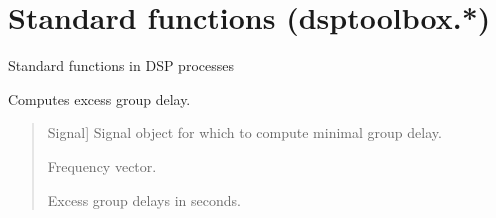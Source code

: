 \documentclass[letterpaper,10pt,english]{sphinxmanual}
\begin{document}
\sphinxstepscope


\section{Standard functions (dsptoolbox.*)}
\label{\detokenize{modules/dsptoolbox.standard_functions:module-dsptoolbox.standard_functions}}\label{\detokenize{modules/dsptoolbox.standard_functions:standard-functions-dsptoolbox}}\label{\detokenize{modules/dsptoolbox.standard_functions::doc}}
\sphinxAtStartPar
Standard functions in DSP processes

\begin{fulllineitems}
\label{\detokenize{modules/dsptoolbox.standard_functions:dsptoolbox.standard_functions.excess_group_delay}}
\pysigstartsignatures
{}
\pysigstopsignatures
\sphinxAtStartPar
Computes excess group delay.
\begin{quote}\begin{description}
\begin{description}
\sphinxlineitem{\sphinxstylestrong{signal}}{[}Signal{]}
\sphinxAtStartPar
Signal object for which to compute minimal group delay.

\end{description}

\begin{description}
\sphinxlineitem{\sphinxstylestrong{f}}{[}\sphinxtitleref{np.ndarray}{]}
\sphinxAtStartPar
Frequency vector.

\sphinxlineitem{\sphinxstylestrong{ex\_gd}}{[}\sphinxtitleref{np.ndarray}{]}
\sphinxAtStartPar
Excess group delays in seconds.

\end{description}

\end{description}\end{quote}

\end{fulllineitems}
\end{document}

